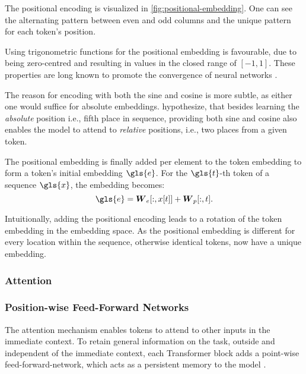 The positional encoding is visualized in \cref{fig:positional-embedding}. One can see the alternating pattern between even and odd columns and the unique pattern for each token's position.

Using trigonometric functions for the positional embedding is favourable, due to being zero-centred and resulting in values in the closed range of $[-1,1]$. These properties are long known to promote the convergence of neural networks \autocites[][8-9]{lecunEfficientBackProp2012}[][2]{ioffeBatchNormalizationAccelerating2015}.

The reason for encoding with both the sine and cosine is more subtle, as either one would suffice for absolute embeddings. \textcite[][6]{vaswaniAttentionAllYou2017} hypothesize, that besides learning the \emph{absolute} position i.e., fifth place in sequence, providing both sine and cosine also enables the model to attend to \emph{relative} positions, i.e., two places from a given token.

The positional embedding is finally added per element to the token embedding to form a token's initial embedding $\gls{e}$. For the $\gls{t}$-th token of a sequence $\gls{x}$, the embedding becomes:
\begin{equation}
\gls{e}=\boldsymbol{W}_e[:, x[t]]+\boldsymbol{W}_p[:, t].
\label{eq:positional-embedding}
\end{equation}

Intuitionally, adding the positional encoding leads to a rotation of the token embedding in the embedding space. As the positional embedding is different for every location within the sequence, otherwise identical \glspl{token}, now have a unique embedding.

\subsubsection{Attention}\label{sec:attention}

\subsubsection{Position-wise Feed-Forward Networks}\label{sec:position-wise-ffn}

The attention mechanism enables tokens to attend to other inputs in the immediate context. To retain general information on the task, outside and independent of the immediate context, each Transformer block adds a point-wise \gls{feed-forward-network}, which acts as a persistent memory to the model \autocite[][3]{sukhbaatarAugmentingSelfattentionPersistent2019}.

